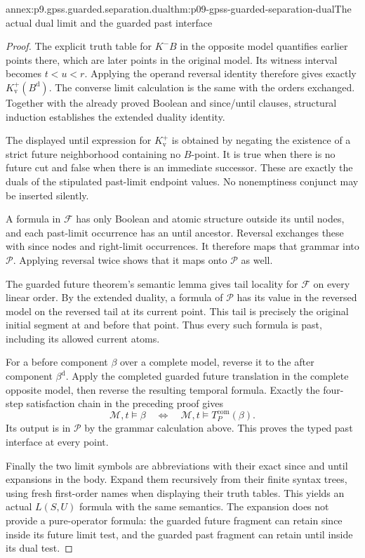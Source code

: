 \begin{annexitem}{annex:p9.gpss.guarded.separation.dual}{thm:p09-gpss-guarded-separation-dual}{The actual dual limit and the guarded past interface}
\begin{proof}
The explicit truth table for
\(K^-B\) in the opposite
model quantifies earlier
points there, which are
later points in the
original model. Its
witness interval becomes
\(t<u<r\). Applying the
operand reversal identity
therefore gives exactly
\(K^+_{\mathrm v}(B^{\mathrm d})\).
The converse limit calculation
is the same with the
orders exchanged. Together
with the already proved
Boolean and since/until
clauses, structural induction
establishes the extended
duality identity.

The displayed until
expression for \(K^+_{\mathrm v}\)
is obtained by negating
the existence of a
strict future neighborhood
containing no \(B\)-point.
It is true when there
is no future cut and
false when there is an
immediate successor.
These are exactly the
duals of the stipulated
past-limit endpoint values.
No nonemptiness conjunct
may be inserted silently.

A formula in \(\mathcal F\)
has only Boolean and
atomic structure outside
its until nodes, and
each past-limit occurrence
has an until ancestor.
Reversal exchanges these
with since nodes and
right-limit occurrences.
It therefore maps that
grammar into \(\mathcal P\).
Applying reversal twice
shows that it maps
onto \(\mathcal P\)
as well.

The guarded future
theorem's semantic
lemma gives tail
locality for \(\mathcal F\)
on every linear order.
By the extended
duality, a formula
of \(\mathcal P\)
has its value in
the reversed model
on the reversed
tail at its current
point. This tail
is precisely the
original initial
segment at and
before that point.
Thus every such
formula is past,
including its
allowed current
atoms.

For a before component
\(\beta\) over a
complete model,
reverse it to the
after component
\(\beta^{\mathrm d}\).
Apply the completed
guarded future
translation in
the complete
opposite model,
then reverse
the resulting
temporal formula.
Exactly the
four-step
satisfaction chain
in the preceding
proof gives
\[
             \mathcal M,t\models\beta
                 \quad\Longleftrightarrow\quad
             \mathcal M,t\models T_P^{\mathrm{com}}(\beta).
\]
Its output is
in \(\mathcal P\)
by the grammar
calculation above.
This proves the
typed past
interface at
every point.

Finally the two
limit symbols
are abbreviations
with their exact
since and until
expansions in
the body. Expand
them recursively
from their finite
syntax trees,
using fresh
first-order names
when displaying
their truth tables.
This yields an
actual \(L(S,U)\)
formula with
the same semantics.
The expansion
does not provide
a pure-operator
formula: the
guarded future
fragment can
retain since
inside its
future limit
test, and the
guarded past
fragment can
retain until
inside its
dual test.
\end{proof}
\end{annexitem}

